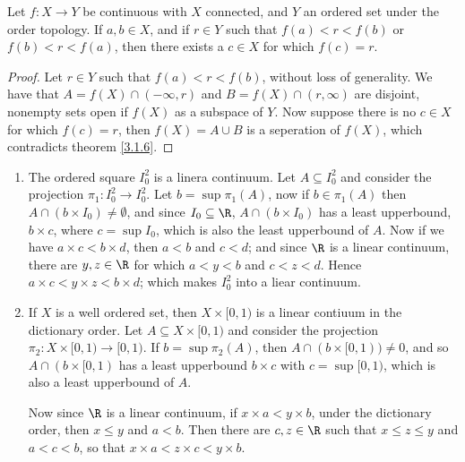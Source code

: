\begin{theorem}\label{3.2.2}
    Let $f:X \rightarrow Y$ be continuous with  $X$ connected, and  $Y$ an ordered set under the
    order topology. If  $a,b \in X$, and if  $r \in Y$ such that  $f(a)<r<f(b)$ or $f(b)<r<f(a)$,
    then there exists a $c \in X$ for which  $f(c)=r$.
\end{theorem}
\begin{proof}
    Let $r \in Y$ such that  $f(a)<r<f(b)$, without loss of generality. We have that $A=f(X) \cap
    (-\infty, r)$ and $B=f(X) \cap (r ,\infty)$ are disjoint, nonempty sets open if $f(X)$ as a
    subspace of $Y$. Now suppose there is no  $c \in X$ for which  $f(c)=r$, then $f(X)=A \cup B$ is
    a seperation of $f(X)$, which contradicts theorem \ref{3.1.6}.
\end{proof}

\begin{example}
    \begin{enumerate}[label=(\arabic*)]
        \item The ordered square $I_0^2$ is a linera continuum. Let $A \subseteq I_0^2$ and consider
            the projection $\pi_1:I_0^2 \rightarrow I_0^2$. Let $b=\sup{\pi_1(A)}$, now if $b \in
            \pi_1(A)$ then $A \cap (b \times I_0) \neq \emptyset$, and since $I_0 \subseteq \R$, $A
            \cap (b \times I_0)$ has a least upperbound, $b \times c$, where  $c=\sup{I_0}$, which
            is also the least upperbound of $A$. Now if we have $a \times c < b \times d$, then
            $a<b$ and  $c<d$; and since  $\R$ is a linear continuum, there are $y,z \in \R$ for
            which  $a<y<b$ and  $c<z<d$. Hence  $a \times c < y \times z < b \times d$; which makes
            $ I_0^2$ into a liear continuum.

        \item If $X$ is a well ordered set, then  $X \times [0,1)$ is a linear contiuum in the
            dictionary order. Let $A \subseteq X \times [0,1)$ and consider the projection $\pi_2:X
            \times [0,1) \rightarrow [0,1)$. If $b=\sup{\pi_2(A)}$, then $A \cap (b \times [0,1)) \neq
            0$, and so $A \cap (b \times [0,1)$ has a least upperbound $b \times c$ with
            $c=\sup{[0,1)}$, which is also a least upperbound of $A$.

            Now since $\R$ is a linear continuum, if $x \times a < y \times b$, under the dictionary
            order, then  $x \leq y$ and  $a<b$. Then there are  $c,z \in \R$ such that  $x \leq z
            \leq y$ and  $a<c<b$, so that $x \times a < z \times c < y \times b$.
    \end{enumerate}
\end{example} 


